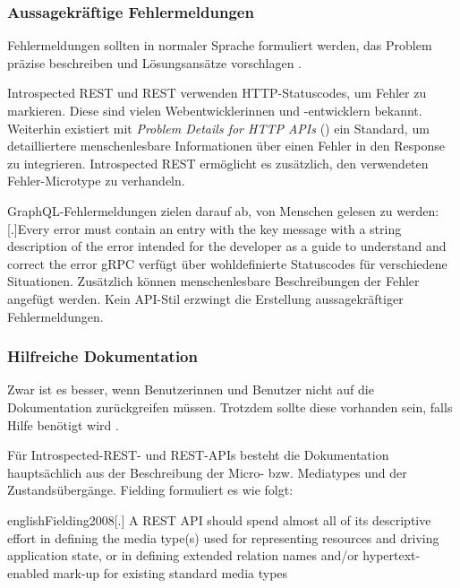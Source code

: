 
\subsubsection{Aussagekräftige Fehlermeldungen}
Fehlermeldungen sollten in normaler Sprache formuliert werden, das Problem präzise beschreiben und Lösungsansätze vorschlagen \autocite[S.~142ff.]{Nielsen1994}.

\para{}Introspected REST und REST verwenden HTTP-Statuscodes, um Fehler zu markieren. Diese sind vielen Webentwicklerinnen und -entwicklern bekannt. Weiterhin existiert mit \emph{Problem Details for HTTP APIs} (\autocite{RFC7807}) ein Standard, um detailliertere menschenlesbare Informationen über einen Fehler in den Response zu integrieren. Introspected REST ermöglicht es zusätzlich, den verwendeten Fehler-Microtype zu verhandeln.

GraphQL-Fehlermeldungen zielen darauf ab, von Menschen gelesen zu werden: [.]{Every error must contain an entry with the key message with a string description of the error intended for the developer as a guide to understand and correct the error} gRPC verfügt über wohldefinierte Statuscodes\footnotemark{} für verschiedene Situationen. Zusätzlich können menschenlesbare Beschreibungen der Fehler angefügt werden. Kein API-Stil erzwingt die Erstellung aussagekräftiger Fehlermeldungen.



\subsubsection{Hilfreiche Dokumentation}
Zwar ist es besser, wenn Benutzerinnen und Benutzer nicht auf die Dokumentation zurückgreifen müssen. Trotzdem sollte diese vorhanden sein, falls Hilfe benötigt wird \autocite[S.~148ff.]{Nielsen1994}.

\para{}Für Introspected-REST- und REST-APIs besteht die Dokumentation hauptsächlich aus der Beschreibung der Micro- bzw. Mediatypes und der Zustandsübergänge. Fielding formuliert es wie folgt:

\begin{foreigndisplaycquote}{english}{Fielding2008}[.]
    A REST API should spend almost all of its descriptive effort in defining the media type(s) used for representing resources and driving application state, or in defining extended relation names and/or hypertext-enabled mark-up for existing standard media types
\end{foreigndisplaycquote}

